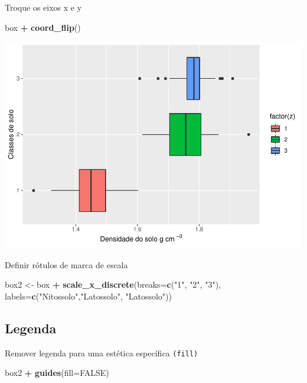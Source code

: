 \documentclass[
]{book}
\newenvironment{Shaded}{\begin{snugshade}}{\end{snugshade}}
\newcommand{\DataTypeTok}[1]{\textcolor[rgb]{0.13,0.29,0.53}{#1}}
\newcommand{\KeywordTok}[1]{\textcolor[rgb]{0.13,0.29,0.53}{\textbf{#1}}}
\newcommand{\NormalTok}[1]{#1}
\newcommand{\OperatorTok}[1]{\textcolor[rgb]{0.81,0.36,0.00}{\textbf{#1}}}
\newcommand{\OtherTok}[1]{\textcolor[rgb]{0.56,0.35,0.01}{#1}}
\newcommand{\StringTok}[1]{\textcolor[rgb]{0.31,0.60,0.02}{#1}}
\begin{document}
Troque os eixos x e y

\begin{Shaded}
\begin{Highlighting}[]
\NormalTok{box }\OperatorTok{+}
\StringTok{  }\KeywordTok{coord_flip}\NormalTok{()}
\end{Highlighting}
\end{Shaded}

\includegraphics{TudodoR_files/figure-latex/unnamed-chunk-206-1.pdf}

Definir rótulos de marca de escala

\begin{Shaded}
\begin{Highlighting}[]
\NormalTok{box2 <-}\StringTok{ }\NormalTok{box }\OperatorTok{+}
\StringTok{          }\KeywordTok{scale_x_discrete}\NormalTok{(}\DataTypeTok{breaks=}\KeywordTok{c}\NormalTok{(}\StringTok{"1"}\NormalTok{, }\StringTok{"2"}\NormalTok{, }\StringTok{"3"}\NormalTok{),}
            \DataTypeTok{labels=}\KeywordTok{c}\NormalTok{(}\StringTok{"Nitossolo"}\NormalTok{,}\StringTok{"Latossolo"}\NormalTok{, }\StringTok{"Latossolo"}\NormalTok{))}
\end{Highlighting}
\end{Shaded}

\hypertarget{legenda}{%
\subsection{Legenda}\label{legenda}}

Remover legenda para uma estética específica \texttt{(fill)}

\begin{Shaded}
\begin{Highlighting}[]
\NormalTok{box2 }\OperatorTok{+}\StringTok{ }\KeywordTok{guides}\NormalTok{(}\DataTypeTok{fill=}\OtherTok{FALSE}\NormalTok{)}
\end{Highlighting}
\end{Shaded}
\end{document}
